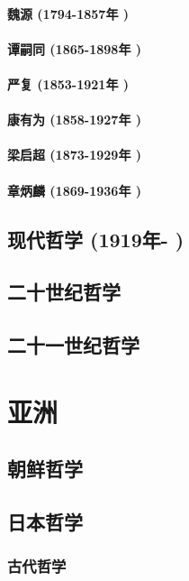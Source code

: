 \documentclass[UTF8]{../RepresentationUniverse}
\begin{document}
    \paragraph{魏源 (1794-1857年 )}
    \paragraph{谭嗣同 (1865-1898年 )}
    \paragraph{严复 (1853-1921年 )}
    \paragraph{康有为 (1858-1927年 )}
    \paragraph{梁启超 (1873-1929年 )}
    \paragraph{章炳麟 (1869-1936年 )}

\subsection{现代哲学 (1919年- )}
\subsection{二十世纪哲学}
\subsection{二十一世纪哲学}



\section{亚洲}
    
\subsection{朝鲜哲学}
\subsection{日本哲学}
    \subsubsection{古代哲学}
\end{document}
